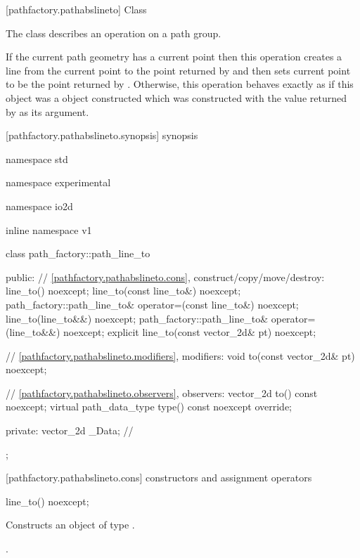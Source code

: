  [pathfactory.pathabslineto] {Class }

\pnum
{}
The class  describes an operation on a path group.

\pnum
If the current path geometry has a current point then this operation creates a line from the current point to the point returned by  and then sets current point to be the point returned by . Otherwise, this operation behaves exactly as if this object was a  object constructed which was constructed with the value returned by  as its argument.

 [pathfactory.pathabslineto.synopsis] { synopsis}

\begin{codeblock}
namespace std { namespace experimental { namespace io2d { inline namespace v1 {
  class path_factory::path_line_to {
  public:
    // \ref{pathfactory.pathabslineto.cons}, construct/copy/move/destroy:
    line_to() noexcept;
    line_to(const line_to&) noexcept;
    path_factory::path_line_to& operator=(const line_to&) noexcept;
    line_to(line_to&&) noexcept;
    path_factory::path_line_to& operator=(line_to&&) noexcept;
    explicit line_to(const vector_2d& pt) noexcept;

    // \ref{pathfactory.pathabslineto.modifiers}, modifiers:
    void to(const vector_2d& pt) noexcept;

    // \ref{pathfactory.pathabslineto.observers}, observers:
    vector_2d to() const noexcept;
    virtual path_data_type type() const noexcept override;
    
  private:
    vector_2d _Data; // \expos
  };
} } } }
\end{codeblock}

 [pathfactory.pathabslineto.cons] { constructors and assignment operators}

\begin{itemdecl}
    line_to() noexcept;
\end{itemdecl}
\begin{itemdescr}
	\pnum
	\effects
	Constructs an object of type .
	
	\pnum
	\postconditions
	.
\end{itemdescr}

